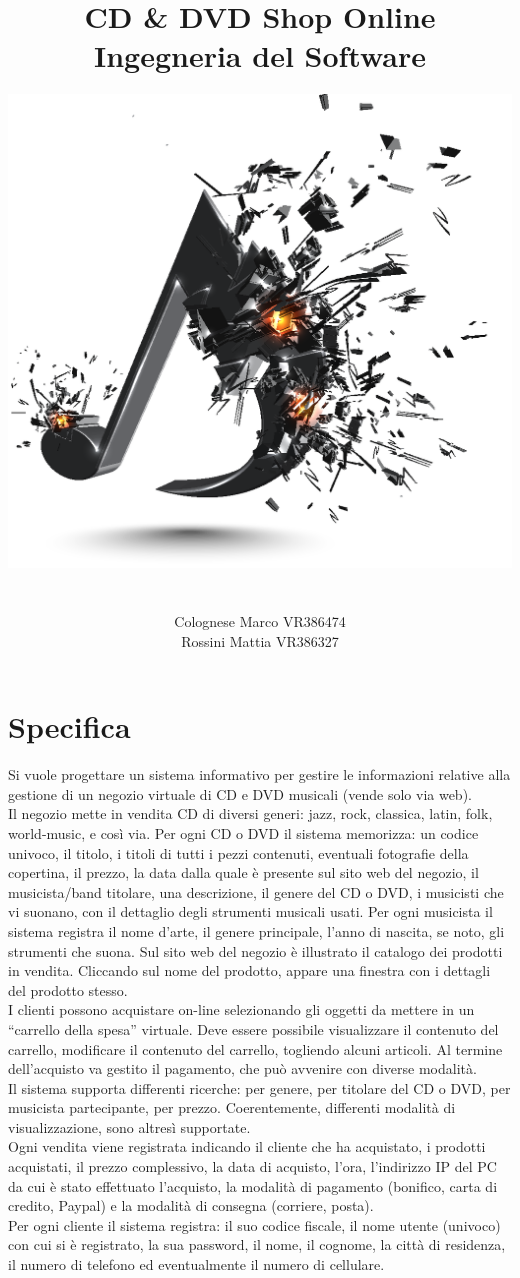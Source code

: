 \documentclass[a4paper,12pt]{report}
\title{\textbf{{\huge {\huge CD \& DVD Shop Online}}} \\ Ingegneria del Software}
\author{\includegraphics[scale=7.0]{Sfondo}
	\\ \\ \\
	Colognese Marco VR386474\\
	Rossini Mattia VR386327}
\date{}
\begin{document}
	
	\maketitle
	
	
	\tableofcontents
	
	
	
	\chapter*{Specifica}
	\small{Si vuole progettare un sistema informativo per gestire le informazioni relative alla gestione di un negozio virtuale di CD e DVD musicali (vende solo via web).\\
	Il negozio mette in vendita CD di diversi generi: jazz, rock, classica, latin, folk, world-music, e così via. Per ogni CD o DVD il sistema memorizza: un codice univoco, il titolo, i titoli di tutti i pezzi contenuti, eventuali fotografie della copertina, il prezzo, la data dalla quale è presente sul sito web del negozio, il musicista/band titolare, una descrizione, il genere del CD o DVD, i musicisti che vi suonano, con il dettaglio degli strumenti musicali usati. Per ogni musicista il sistema registra il nome d’arte, il genere principale, l’anno di nascita, se noto, gli strumenti che suona. Sul sito web del negozio è illustrato il catalogo dei prodotti in vendita. Cliccando sul nome del prodotto, appare una finestra con i dettagli del prodotto stesso.\\
	I clienti possono acquistare on-line selezionando gli oggetti da mettere in un “carrello della spesa” virtuale. Deve essere possibile visualizzare il contenuto del carrello, modificare il contenuto del carrello, togliendo alcuni articoli. Al termine dell’acquisto va gestito il pagamento, che può avvenire con diverse modalità.\\
	Il sistema supporta differenti ricerche: per genere, per titolare del CD o DVD, per musicista partecipante, per prezzo. Coerentemente, differenti modalità di visualizzazione, sono altresì supportate.\\
	Ogni vendita viene registrata indicando il cliente che ha acquistato, i prodotti acquistati, il prezzo complessivo, la data di acquisto, l’ora, l’indirizzo IP del PC da cui è stato effettuato l’acquisto, la modalità di pagamento (bonifico, carta di credito, Paypal) e la modalità di consegna (corriere, posta).\\
	Per ogni cliente il sistema registra: il suo codice fiscale, il nome utente (univoco) con cui si è registrato, la sua password, il nome, il cognome, la città di residenza, il numero di telefono ed eventualmente il numero di cellulare.\\
}
\end{document}
